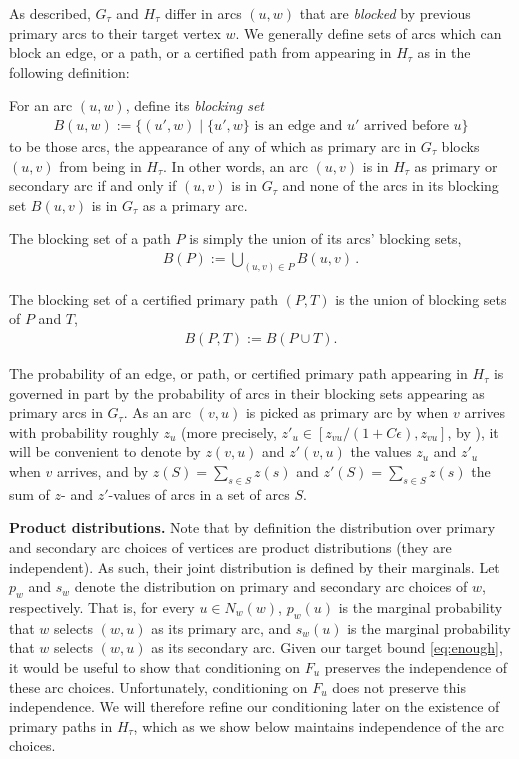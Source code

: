 As described, $G_\tau$ and $H_\tau$ differ in arcs $(u,w)$ that are \emph{blocked} by previous primary arcs to their target vertex $w$. We generally define sets of arcs which can block an edge, or a path, or a certified path from appearing in $H_\tau$ as in the following definition:
\begin{Def}  \label{def:blocking}
	For an arc $(u,w)$, define its \emph{blocking set}
	\begin{align*}
	B(u,w) := \{(u', w) \mid \mbox{$\{u',w\}$ is an edge and $u'$ arrived before $u$}\}
	\end{align*}
	to be those arcs, the appearance of any of which as primary arc in $G_\tau$ blocks $(u,v)$ from being in $H_\tau$. In other words, an arc $(u,v)$ is in $H_\tau$ as primary or secondary arc if and only if $(u,v)$ is in $G_\tau$ and none of the arcs in its blocking set $B(u,v)$ is in $G_\tau$ as a primary arc. 
	
	The blocking set of a path $P$ is simply the union of its arcs' blocking sets, 
	\begin{align*}
	B(P) := \bigcup_{(u,v) \in P} B(u,v)\,.
	\end{align*}	

	The blocking set of a certified primary path $(P,T)$ is the union of blocking sets of $P$ and $T$,
	\begin{align*}
	B(P, T) := B(P \cup T).
	\end{align*}
\end{Def}
The probability of an edge, or path, or certified primary path appearing in $H_\tau$ is governed in part by the probability of arcs in their blocking sets appearing as primary arcs in $G_\tau$. As an arc $(v,u)$ is picked as primary arc by when $v$ arrives with probability roughly $z_u$ (more precisely, $z'_u \in[z_{vu}/(1+C\epsilon), z_{vu}]$, by ), it will be convenient to denote by $z(v,u)$ and $z'(v,u)$ the values $z_u$ and $z'_u$ when $v$ arrives, and by $z(S)=\sum_{s\in S} z(s)$ and $z'(S)=\sum_{s\in S} z(s)$ the sum of $z$- and $z'$-values of arcs in a set of arcs $S$.

\textbf{Product distributions.} 
Note that by definition the distribution over primary and secondary arc choices of vertices are product distributions (they are independent). As such, their joint distribution is defined by their marginals.
Let $p_w$ and $s_w$ denote the distribution on primary and secondary arc choices of $w$, respectively. That is, for every $u\in N_w(w)$, $p_w(u)$ is the marginal probability that $w$ 
selects $(w, u)$ as its primary arc, and $s_w(u)$ is the marginal probability that $w$ selects $(w,u)$ as its secondary arc. 
Given our target bound \eqref{eq:enough}, it would be useful to show that conditioning on $F_u$ preserves the independence of these arc choices. Unfortunately, conditioning on $F_u$ does not preserve this independence. We will therefore refine our conditioning later on the existence of primary paths in $H_\tau$, which as we show below maintains independence of the arc choices.


